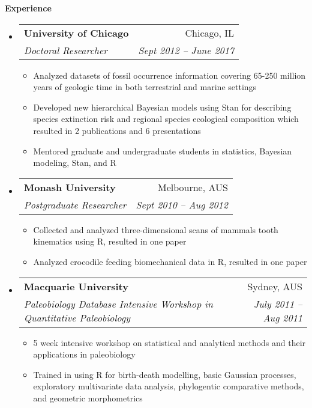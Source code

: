 \documentclass[letterpaper,11pt]{article}
\makeatletter
\newcommand{\resitem}[1]{\item #1 \vspace{-2pt}}
\newcommand{\resheading}[1]{{\large \colorbox{mygrey}{\begin{minipage}{\textwidth}{\textbf{#1 \vphantom{p\^{E}}}}\end{minipage}}}}
\newcommand{\ressubheading}[4]{
\begin{tabular*}{6.5in}{l@{\extracolsep{\fill}}r}
		\textbf{#1} & #2 \\
		\textit{#3} & \textit{#4} \\
\end{tabular*}\vspace{-6pt}}
\makeatother
\begin{document}
\resheading{Experience}
	\begin{itemize}
		\item 
			\ressubheading{University of Chicago}{Chicago, IL}{Doctoral Researcher}{Sept 2012 -- June 2017}
				{ \footnotesize
				\begin{itemize}
            \resitem{Analyzed datasets of fossil occurrence information covering 65-250 million years of geologic time in both terrestrial and marine settings }
            \resitem{Developed new hierarchical Bayesian models using Stan for describing species extinction risk and regional species ecological composition which resulted in 2 publications and 6 presentations }
            \resitem{Mentored graduate and undergraduate students in statistics, Bayesian modeling, Stan, and R }
				\end{itemize}
				}
		\item 
			\ressubheading{Monash University}{Melbourne, AUS}{Postgraduate Researcher}{Sept 2010 -- Aug 2012}
				{ \footnotesize
				\begin{itemize}
            \resitem{Collected and analyzed three-dimensional scans of mammals tooth kinematics using R, resulted in one paper }
            \resitem{Analyzed crocodile feeding biomechanical data in R, resulted in one paper }
				\end{itemize}
				}
		\item 
			\ressubheading{Macquarie University}{Sydney, AUS}{Paleobiology Database Intensive Workshop in Quantitative Paleobiology}{July 2011 -- Aug 2011}
				{ \footnotesize
				\begin{itemize}
            \resitem{5 week intensive workshop on statistical and analytical methods and their applications in paleobiology}
            \resitem{Trained in using R for birth-death modelling, basic Gaussian processes, exploratory multivariate data analysis, phylogentic comparative methods, and geometric morphometrics}
				\end{itemize}
				}

\end{itemize}
\end{document}
